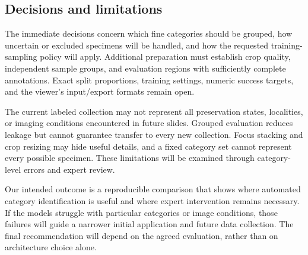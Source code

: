 \documentclass[conference,letterpaper]{IEEEtran}
\begin{document}
\subsection{Decisions and limitations}
The immediate decisions concern which fine categories should be grouped, how uncertain or excluded specimens will be handled, and how the requested training-sampling policy will apply. Additional preparation must establish crop quality, independent sample groups, and evaluation regions with sufficiently complete annotations. Exact split proportions, training settings, numeric success targets, and the viewer's input/export formats remain open.

The current labeled collection may not represent all preservation states, localities, or imaging conditions encountered in future slides. Grouped evaluation reduces leakage but cannot guarantee transfer to every new collection. Focus stacking and crop resizing may hide useful details, and a fixed category set cannot represent every possible specimen. These limitations will be examined through category-level errors and expert review.

Our intended outcome is a reproducible comparison that shows where automated category identification is useful and where expert intervention remains necessary. If the models struggle with particular categories or image conditions, those failures will guide a narrower initial application and future data collection. The final recommendation will depend on the agreed evaluation, rather than on architecture choice alone.

\clearpage
{}


\end{document}
